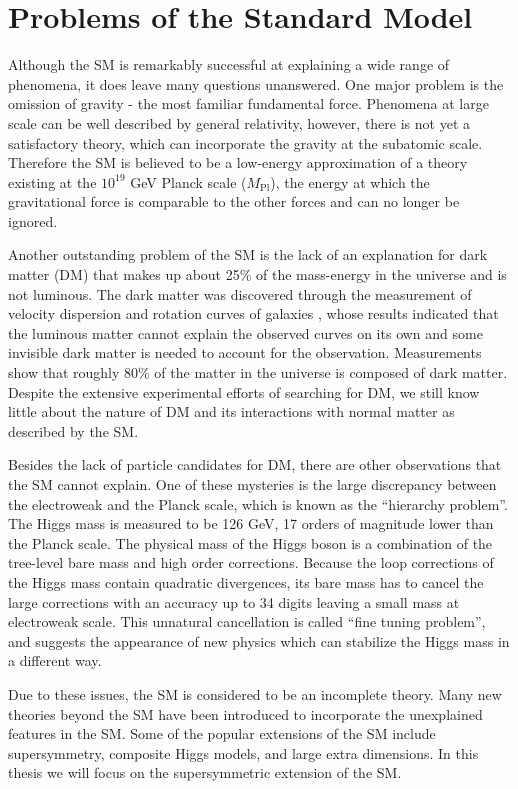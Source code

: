 \documentclass[thesis.tex]{subfiles}
\begin{document}
\FloatBarrier
\section{Problems of the Standard Model}
Although the SM is remarkably successful at explaining a wide range of phenomena, it does leave many questions unanswered. 
One major problem is the omission of gravity - the most familiar fundamental force. 
Phenomena at large scale can be well described by general relativity, however, there is not yet a satisfactory theory, which can incorporate the gravity at the subatomic scale. 
Therefore the SM is believed to be a low-energy approximation of a theory existing at the $10^{19}$ GeV Planck scale ($M_{\text{Pl}}$), the energy at which the gravitational force is comparable to the other forces and can no longer be ignored.

Another outstanding problem of the SM is the lack of an explanation for dark matter (DM) that makes up about 25\% of the mass-energy in the universe and is not luminous.  
The dark matter was discovered through the measurement of velocity dispersion and rotation curves of galaxies \cite{DMRubin}, whose results indicated that the luminous matter cannot explain the observed curves on its own and some invisible dark matter is needed to account for the observation. Measurements show that roughly 80\% of the matter in the universe is composed of dark matter. Despite the extensive experimental efforts of searching for DM, we still know little about the nature of DM and its interactions with normal matter as described by the SM. 

Besides the lack of particle candidates for DM, there are other observations that the SM cannot explain. 
One of these mysteries is the large discrepancy between the electroweak and the Planck scale, which is known as the ``hierarchy problem''. 
The Higgs mass is measured to be 126 GeV, 17 orders of magnitude lower than the Planck scale. 
The physical mass of the Higgs boson is a combination of the tree-level bare mass and high order corrections. 
Because the loop corrections of the Higgs mass contain quadratic divergences, its bare mass has to cancel the large corrections with an accuracy up to 34 digits leaving a small mass at electroweak scale. 
This unnatural cancellation is called ``fine tuning problem'', and suggests the appearance of new physics which can stabilize the Higgs mass in a different way.

Due to these issues, the SM is considered to be an incomplete theory.
Many new theories beyond the SM have been introduced to incorporate the unexplained features in the SM. 
Some of the popular extensions of the SM include supersymmetry, composite Higgs models, and large extra dimensions.
In this thesis we will focus on the supersymmetric extension of the SM.    
\end{document}
